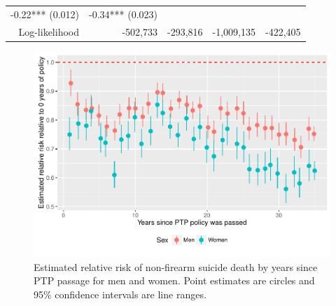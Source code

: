 \documentclass[]{article}
\begin{document}
\begin{longtable}[c]{@{}rrrrr@{}}
\begin{minipage}[t]{0.18\columnwidth}\raggedleft\strut
-0.22*** (0.012)
\strut\end{minipage} &
\begin{minipage}[t]{0.15\columnwidth}\raggedleft\strut
-0.34*** (0.023)
\strut\end{minipage}\tabularnewline
\begin{minipage}[t]{0.17\columnwidth}\raggedleft\strut
Log-likelihood
\strut\end{minipage} &
\begin{minipage}[t]{0.20\columnwidth}\raggedleft\strut
-502,733
\strut\end{minipage} &
\begin{minipage}[t]{0.16\columnwidth}\raggedleft\strut
-293,816
\strut\end{minipage} &
\begin{minipage}[t]{0.18\columnwidth}\raggedleft\strut
-1,009,135
\strut\end{minipage} &
\begin{minipage}[t]{0.15\columnwidth}\raggedleft\strut
-422,405
\strut\end{minipage}\tabularnewline
\bottomrule
\end{longtable}

\begin{figure}[htbp]
\centering
\includegraphics{Thesis_files/figure-latex/supplement-RR-plot-1.pdf}
\caption{Estimated relative risk of non-firearm suicide death by years
since PTP passage for men and women. Point estimates are circles and
95\% confidence intervals are line ranges.}
\end{figure}
\end{document}
